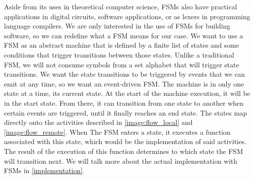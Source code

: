 Aside from its uses in theoretical computer science, FSMs also have practical applications in digital circuits, software applications, or as lexers in programming language compilers.
We are only interested in the use of FSMs for building software, so we can redefine what a FSM means for our case.
We want to use a FSM as an abstract machine that is defined by a finite list of states and some conditions that trigger transitions between those states.
Unlike a traditional FSM, we will not consume symbols from a set alphabet that will trigger state transitions.
We want the state transitions to be triggered by events that we can emit at any time, so we want an event-driven FSM.
The machine is in only one state at a time, its current state.
At the start of the machine execution, it will be in the start state.
From there, it can transition from one state to another when certain events are triggered, until it finally reaches an end state.
The states map directly onto the activities described in \autoref{image:flow_local} and \autoref{image:flow_remote}.
When The FSM enters a state, it executes a function associated with this state, which would be the implementation of said activities.
The result of the execution of this function determines to which state the FSM will transition next.
We will talk more about the actual implementation with FSMs in \autoref{implementation}.
